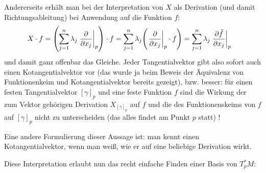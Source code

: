\documentclass[../H_Analysis_main.tex]{subfiles}
\begin{document}
\begin{bsp}
Andererseits erhält man bei der Interpretation von $X$ als Derivation (und damit Richtungsableitung) bei Anwendung auf die Funktion $f$:
\begin{align*}
X \cdot f &= \qty(\sum_{j = 1}^n \lambda_j \eval{\pdv{x_j}}_p) \cdot f = \sum_{j = 1}^n \lambda_j \qty(\eval{\pdv{x_j}}_p \cdot f) = \sum_{j = 1}^n \lambda_j \eval{\pdv{\tilde{f}}{x_j}}_p
\end{align*}
und damit ganz offenbar das Gleiche. Jeder Tangentialvektor gibt also sofort auch einen Kotangentialvektor vor (das wurde ja beim Beweis der Äquivalenz von Funktionenkeim und Kotangentialvektor bereits gezeigt), bzw. besser: für einen festen Tangentialvektor $[\gamma]_p$ und eine feste Funktion $f$ sind die Wirkung der zum Vektor gehörigen Derivation $X_{[\gamma]_p}$ auf $f$ und die des Funktionenskeims von $f$ auf $[\gamma]_p$ nicht zu unterscheiden (das alles findet am Punkt $p$ statt) !

Eine andere Formulierung dieser Aussage ist: man kennt einen Kotangentialvektor, wenn man weiß, wie er auf eine beliebige Derivation wirkt.
\end{bsp}


Diese Interpretation erlaubt nun das recht einfache Finden einer Basis von $T^*_p M$:
\end{document}
